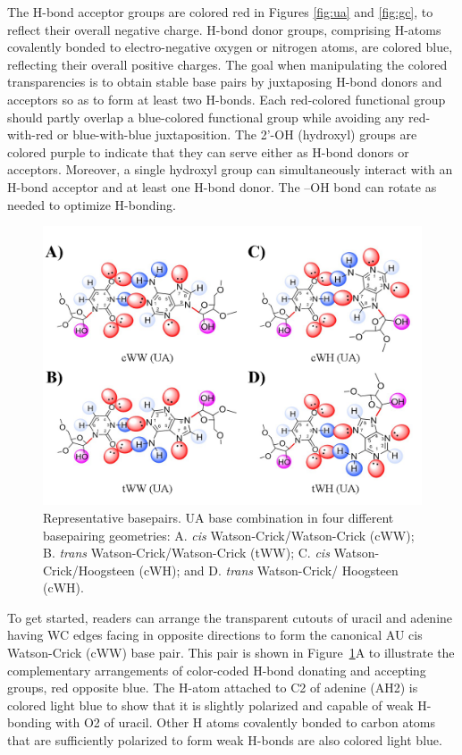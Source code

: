 The H-bond acceptor groups are colored red in Figures \ref{fig:ua} and
\ref{fig:gc}, to reflect their overall negative charge. H-bond donor groups,
comprising H-atoms covalently bonded to electro-negative oxygen or nitrogen
atoms, are colored blue, reflecting their overall positive charges. The goal
when manipulating the colored transparencies is to obtain stable base pairs by
juxtaposing H-bond donors and acceptors so as to form at least two H-bonds. Each
red-colored functional group should partly overlap a blue-colored functional
group while avoiding any red-with-red or blue-with-blue juxtaposition. The 2’-OH
(hydroxyl) groups are colored purple to indicate that they can serve either as
H-bond donors or acceptors. Moreover, a single hydroxyl group can simultaneously
interact with an H-bond acceptor and at least one H-bond donor. The –OH bond can
rotate as needed to optimize H-bonding.

\begin{figure}
  \includegraphics[width=\linewidth]{chapter-1/figs/basepairs}
  \caption{Representative basepairs. UA base combination in four different
    basepairing geometries: A. \emph{cis} Watson-Crick/Watson-Crick (cWW); B. \emph{trans}
    Watson-Crick/Watson-Crick (tWW); C. \emph{cis} Watson-Crick/Hoogsteen (cWH); and D.
  \emph{trans} Watson-Crick/ Hoogsteen (cWH).}
  \label{fig:basepairs}
\end{figure}

To get started, readers can arrange the transparent cutouts of uracil and
adenine having WC edges facing in opposite directions to form the canonical AU
cis Watson-Crick (cWW) base pair. This pair is shown in Figure~\ref{fig:basepairs}A to illustrate
the complementary arrangements of color-coded H-bond donating and accepting
groups, red opposite blue. The H-atom attached to C2 of adenine (AH2) is colored
light blue to show that it is slightly polarized and capable of weak H-bonding
with O2 of uracil. Other H atoms covalently bonded to carbon atoms that are
sufficiently polarized to form weak H-bonds are also colored light blue. 


